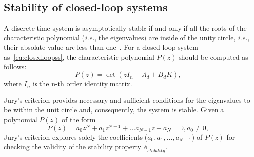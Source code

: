 \documentclass[runningheads,a4paper]{llncs}
\newcommand{\todo}[1]{{\color{red} TODO: #1}}
\begin{document}
\subsection{Stability of closed-loop systems}
\label{ssec:stability}


A discrete-time system is asymptotically stable if and only if all the roots 
of the characteristic polynomial ({\it i.e.}, the eigenvalues) are inside of 
the unity circle, {\it i.e.}, their absolute value are less than 
one~\cite{astrom1997computer}. For a closed-loop system as~\eqref{eq:closedloopss}, 
the characteristic polynomial $P(z)$ should be computed as follows:
\begin{equation}
P(z)= \det( z I_{n} - A_d + B_d K ),
\end{equation}
where $I_{n}$ is the n-th order identity matrix. 

Jury's criterion provides necessary and sufficient conditions for the eigenvalues 
to be within the unit circle and, consequently, the system is stable.  Given a 
polynomial $P(z)$ of the form
$$
P(z) = a_{0}z^{N} + a_{1}z^{N-1} + ... a_{N-1}z + a_{N} = 0, a_{0}\neq 0,
$$
Jury's criterion explores solely the coefficients ($a_{0},a_{1},...,a_{N-1}$) 
of $P(z)$ for checking the validity of the stability property $\phi_{stability}$. 
\end{document}
